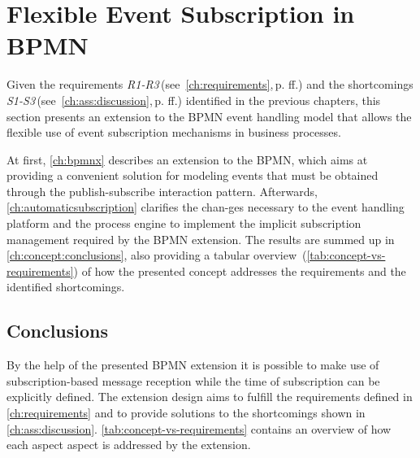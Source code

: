 \chapter{Flexible Event Subscription in BPMN}\label{ch:flexibleeventsubscription}

Given the requirements \textit{R1-R3}\,(see~\autoref{ch:requirements},\,p.\,\pageref{ch:requirements}\,ff.) and the shortcomings \textit{S1-S3}\,(see~\autoref{ch:ass:discussion},\,p.\,\pageref{ch:ass:discussion}\,ff.) identified in the previous chapters, this section presents an extension to the BPMN event handling model that allows the flexible use of event subscription mechanisms in business processes.

At first, \ref{ch:bpmnx} describes an extension to the \acf{BPMN}, which aims at providing a convenient solution for modeling events that must be obtained through the publish-subscribe interaction pattern.
Afterwards, \autoref{ch:automaticsubscription} clarifies the chan-ges necessary to the event handling platform and the process engine to implement the implicit subscription management required by the BPMN extension.
The results are summed up in \autoref{ch:concept:conclusions}, also providing a tabular overview~(\autoref{tab:concept-vs-requirements}) of how the presented concept addresses the requirements and the identified shortcomings.






\section{Conclusions}\label{ch:concept:conclusions}
By the help of the presented BPMN extension it is possible to make use of subscription-based message reception while the time of subscription can be explicitly defined.
The extension design aims to fulfill the requirements defined in \autoref{ch:requirements} and to provide solutions to the shortcomings shown in \autoref{ch:ass:discussion}.
\autoref{tab:concept-vs-requirements} contains an overview of how each aspect aspect is addressed by the extension.

